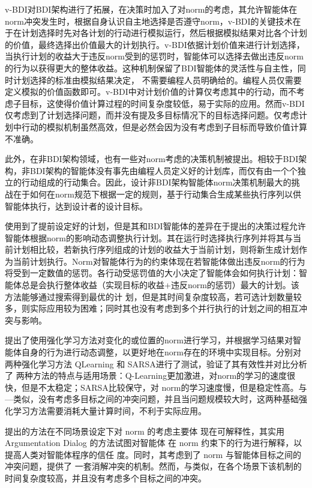 v-BDI\cite{DBLP:journals/eaai/MeneguzziROVL15}对BDI架构进行了拓展，在决策时加入了对norm的考虑，其允许智能体在norm冲突发生时，根据自身认识自主地选择是否遵守norm，v-BDI的关键技术在于在计划选择时先对各计划的行动进行模拟运行，然后根据模拟结果对比各个计划的价值，最终选择出价值最大的计划执行。v-BDI依据计划价值来进行计划选择， 当执行计划的收益大于违反norm受到的惩罚时，智能体可以选择去做出违反norm的行为以获得更大的整体收益。这种机制保留了BDI智能体的灵活性与自主性，同时计划选择的标准由模拟结果决定， 不需要编程人员明确给的。编程人员仅需要定义模拟的价值函数即可。v-BDI中对计划价值的计算仅考虑其中的行动，而不考虑子目标，这使得价值计算过程的时间复杂度较低，易于实际的应用。然而v-BDI仅考虑到了计划选择问题，而并没有提及多目标情况下的目标选择问题。仅考虑计划中行动的模拟机制虽然高效，但是必然会因为没有考虑到子目标而导致价值计算不准确。

此外，在非BDI架构领域，也有一些对norm考虑的决策机制被提出。相较于BDI架构，非BDI架构的智能体没有事先由编程人员定义好的计划库，而仅有由一个个独立的行动组成的行动集合。因此，设计非BDI架构智能体norm决策机制最大的挑战在于如何在norm规范下根据一定的规则，基于行动集合生成某些执行序列以供智能体执行，达到设计者的设计目标。

%
\cite{DBLP:conf/atal/ShamsVPV15}使用到了提前设定好的计划，但是其和BDI智能体的差异在于\cite{DBLP:conf/atal/ShamsVPV15}提出的决策过程允许智能体根据norm的影响动态调整执行计划。其在运行时选择执行序列并将其与当前计划相比较，若新执行序列组成的计划的收益大于当前计划，则将新生成计划作为当前计划执行。Norm对智能体行为的约束体现在若智能体做出违反norm的行为将受到一定数值的惩罚。各行动受惩罚值的大小决定了智能体会如何执行计划：智能体总是会执行整体收益（实现目标的收益+违反norm的惩罚）最大的计划。该方法能够通过搜索得到最优的计 划，但是其时间复杂度较高，若可选计划数量较多，则实际应用较为困难；同时其也没有考虑到多个并行执行的计划之间的相互冲突与影响。

\cite{DBLP:conf/atal/LiMFL15}提出了使用强化学习方法对变化的或位置的norm进行学习，并根据学习结果对智能体自身的行为进行动态调整，以更好地在norm存在的环境中实现目标。\cite{DBLP:conf/atal/LiMFL15f}分别对两种强化学习方法 QLearning 和 SARSA\cite{Sutton2005ReinforcementLA}进行了测试，验证了其有效性并对比分析了 两种方法的特点与适用场景：Q-Learning更加激进，对norm的学习的速度很快，但是不太稳定；SARSA比较保守，对 norm的学习速度慢，但是稳定性高。与—类似，\cite{DBLP:conf/atal/LiMFL15}没有考虑多目标之间的冲突问题，并且当问题规模较大时，这两种基础强化学习方法需要消耗大量计算时间，不利于实际应用。

\cite{DBLP:conf/ijcai/ShamsVOP16,DBLP:journals/taas/ShamsVOP20,DBLP:conf/atal/ShamsVPV15}提出的方法在不同场景设定下对 norm 的考虑主要体 现在可解释性，其实用 Argumentation Dialog 的方法试图对智能体 在 norm 约束下的行为进行解释，以提高人类对智能体程序的信任 度。同时，其考虑到了 norm 与智能体目标之间的冲突问题，提供了 一套消解冲突的机制。然而，与\cite{DBLP:conf/atal/LiMFL15}类似，在各个场景下该机制的 时间复杂度较高，并且没有考虑多个目标之间的冲突。

